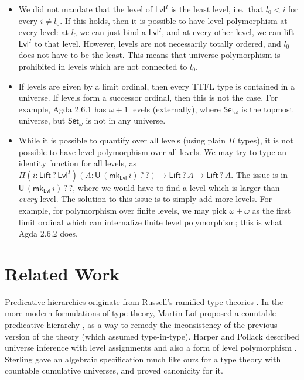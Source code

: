 \documentclass[a4paper,UKenglish,cleveref, autoref, thm-restate]{lipics-v2021}
\theoremstyle{remark}
\theoremstyle{definition}
\newcommand{\Set}[1]{\mathsf{Set_{#1}}}
\newcommand{\U}{\mathsf{U}}
\newcommand{\Lift}{\mathsf{Lift}}
\newcommand{\Lvl}{\mathsf{Lvl}}
\renewcommand{\U}{\mathsf{U}}
\newcommand{\msf}[1]{\mathsf{#1}}
\newcommand{\mkLvl}{\msf{mk}_{\Lvl}}
\begin{document}
\begin{itemize}
\item We did not mandate that the level of $\Lvl^I$ is the least level,
i.e.\ that $l_0 < i$ for every $i \neq l_0$. If this holds, then it is
possible to have level polymorphism at every level: at $l_0$ we can just bind
a $\Lvl^I$, and at every other level, we can lift $\Lvl^I$ to that
level. However, levels are not necessarily totally ordered, and $l_0$ does not
have to be the least. This means that universe polymorphism is prohibited in
levels which are not connected to $l_0$.

\item If levels are given by a limit ordinal, then every TTFL type is contained
in a universe. If levels form a successor ordinal, then this is not the
case. For example, Agda 2.6.1 has $\omega + 1$ levels (externally), where
$\Set{\omega}$ is the topmost universe, but $\Set{\omega}$ is not in any
universe.

\item
While it is possible to quantify over all levels (using plain $\Pi$ types), it
is not possible to have level polymorphism over all levels. We may try to type
an identity function for all levels, as $\Pi(i : \Lift\,?\,\Lvl^I)(A :
\U\,(\mkLvl\,i)\,?\,?) \to \Lift\,?\,A \to \Lift\,?\,A$. The issue is in
$\U\,(\mkLvl\,i)\,?\,?$, where we would have to find a level which is larger
than \emph{every} level. The solution to this issue is to simply add more
levels. For example, for polymorphism over finite levels, we may pick $\omega +
\omega$ as the first limit ordinal which can internalize finite level
polymorphism; this is what Agda 2.6.2 does.
\end{itemize}


\section{Related Work} \label{sec:related}

Predicative hierarchies originate from Russell's ramified type theories
\cite{principia}. In the more modern formulations of type theory, Martin-Löf
proposed a countable predicative hierarchy \cite{martinlof73predicative}, as a
way to remedy the inconsistency of the previous version of the theory (which
assumed type-in-type). Harper and Pollack described universe inference with
level assignments and also a form of level polymorphism \cite{harperpollack}.
Sterling \cite{sterling2019algebraic} gave an algebraic specification much like
ours for a type theory with countable cumulative universes, and proved canonicity
for it.
\end{document}
